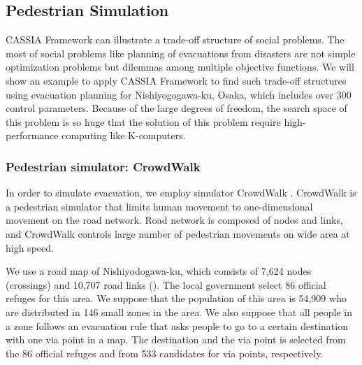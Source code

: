 \subsection{Pedestrian Simulation}
\label{ss:Pedestrian Simulation}
CASSIA Framework can illustrate a trade-off structure of social problems.
The most of social problems like planning of evacuations from disasters
are not simple optimization problems but dilemmas among multiple
objective functions.
We will show an example to apply CASSIA Framework to find
such trade-off structures using evacuation planning for Nishiyogogawa-ku, Osaka,
which includes over 300 control parameters\cite{Noda2018b}.
Because of the large degrees of freedom,
the search space of this problem is so huge
that the solution of this problem require high-performance
computing like K-computers.


\subsubsection{Pedestrian simulator: CrowdWalk}
\label{sss:CrowdWalk}
In order to simulate evacuation, we employ simulator CrowdWalk
\cite{yamashita:2013,yamashita:2014a}.
CrowdWalk is a pedestrian simulator that limits human movement 
to one-dimensional movement on the road network. 
Road network is composed of nodes and links, and CrowdWalk controls 
large number of pedestrian movements on wide area at high speed.

We use a road map of Nishiyodogawa-ku,
which consists of 7,624 nodes (crossings) and 10,707 road links
().
The local government select 86 official refuges for this area.
We suppose that the population of this area is 54,909
who are distributed in 146 small zones in the area.
We also suppose that all people in a zone follows an evacuation rule
that asks people to go to a certain destination with one via point in a map.
The destination and the via point is selected from the 86 official refuges
and from 533 candidates for via points, respectively.

